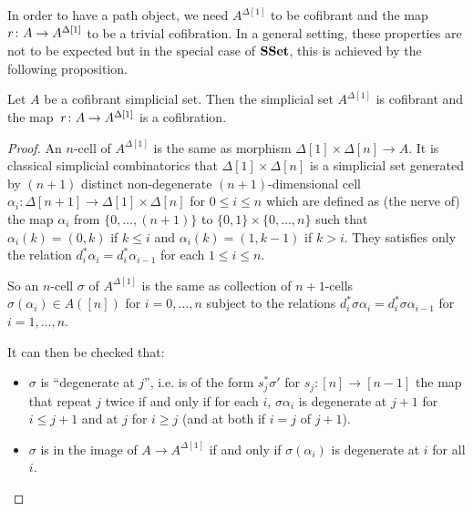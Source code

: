 \documentclass[reqno,10pt,a4paper,oneside,draft]{amsart}
\begin{document}
In order to have a path object, we need $A^{\Delta[1]}$ to be cofibrant and the map $r \colon A \rightarrow A^{\Delta[1]}$ to be a trivial cofibration. In a general setting, these properties are not to be expected
but in the special case of $\mathbf{SSet}$, this is achieved by the following proposition.

\begin{proposition}\label{proposition:PathObjectCofibrant}
Let $A$ be a cofibrant simplicial set. Then the simplicial set $A^{\Delta[1]}$ is cofibrant and the map~$r \colon A \rightarrow A^{\Delta[1]}$ is a cofibration.
\end{proposition}



\begin{proof}
An $n$-cell of $A^{\Delta[1]}$ is the same as morphism $\Delta[1] \times \Delta[n] \rightarrow A$. It is classical simplicial combinatorics that $\Delta[1] \times \Delta[n]$ is a simplicial set generated by $(n+1)$ distinct non-degenerate $(n+1)$-dimensional cell $\alpha_i: \Delta[n+1] \rightarrow \Delta[1] \times \Delta[n]$ for $0 \leqslant i \leqslant n$ which are defined as (the nerve of) the map $\alpha_i$ from $\{0,\dots,(n+1)\}$ to $\{0,1\} \times \{0,\dots,n\}$ such that $\alpha_i(k)=(0,k)$ if $k \leqslant i$ and $\alpha_i(k)=(1,k-1)$ if $k>i$. They satisfies only the relation $d_i^* \alpha_i = d_{i}^* \alpha_{i-1}$ for each $1 \leqslant i \leqslant n$.

So an $n$-cell $\sigma$ of $A^{\Delta[1]}$ is the same as collection of $n+1$-cells $\sigma(\alpha_i) \in A([n])$ for $i=0,\dots,n$ subject to the relations $d_i^* \sigma \alpha_i = d_{i}^* \sigma \alpha_{i-1}$ for $i=1,\dots,n$.


It can then be checked that:

\begin{itemize}

\item $\sigma$ is ``degenerate at $j$'', i.e. is of the form $s_j ^* \sigma'$ for $s_j : [n] \rightarrow [n-1]$ the map that repeat $j$ twice if and only if for each $i$, $\sigma \alpha_i $ is degenerate at $j+1$ for $i \leqslant j+1$ and at $j$ for $i \geqslant j$ (and at both if $i=j$ of $j+1$).

\item $\sigma$ is in the image of $A \rightarrow A^{\Delta[1]}$ if and only if $\sigma(\alpha_i)$ is degenerate at $i$ for all $i$.

\end{itemize}



\end{proof}
\end{document}
